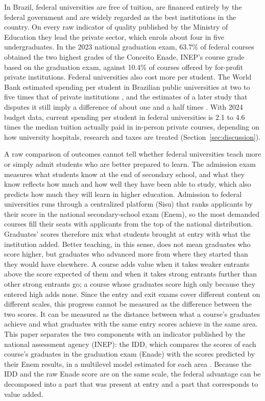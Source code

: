 \documentclass[12pt,letterpaper]{article}
\begin{document}
In Brazil, federal universities are free of tuition, are financed entirely by the federal government and are widely regarded as the best institutions in the country. On every raw indicator of quality published by the Ministry of Education they lead the private sector, which enrols about four in five undergraduates. In the 2023 national graduation exam, 63.7\% of federal courses obtained the two highest grades of the Conceito Enade, INEP's course grade based on the graduation exam, against 10.4\% of courses offered by for-profit private institutions. Federal universities also cost more per student. The World Bank estimated spending per student in Brazilian public universities at two to five times that of private institutions \citep{worldbank2017}, and the estimates of a later study that disputes it still imply a difference of about one and a half times \citep[Table~11]{bielschowsky2022}. With 2024 budget data, current spending per student in federal universities is 2.1 to 4.6 times the median tuition actually paid in in-person private courses, depending on how university hospitals, research and taxes are treated (Section~\ref{sec:discussion}).

A raw comparison of outcomes cannot tell whether federal universities teach more or simply admit students who are better prepared to learn. The admission exam measures what students know at the end of secondary school, and what they know reflects how much and how well they have been able to study, which also predicts how much they will learn in higher education. Admission to federal universities runs through a centralized platform (Sisu) that ranks applicants by their score in the national secondary-school exam (Enem), so the most demanded courses fill their seats with applicants from the top of the national distribution. Graduates' scores therefore mix what students brought at entry with what the institution added. Better teaching, in this sense, does not mean graduates who score higher, but graduates who advanced more from where they started than they would have elsewhere. A course adds value when it takes weaker entrants above the score expected of them and when it takes strong entrants further than other strong entrants go; a course whose graduates score high only because they entered high adds none. Since the entry and exit exams cover different content on different scales, this progress cannot be measured as the difference between the two scores. It can be measured as the distance between what a course's graduates achieve and what graduates with the same entry scores achieve in the same area. This paper separates the two components with an indicator published by the national assessment agency (INEP): the IDD, which compares the scores of each course's graduates in the graduation exam (Enade) with the scores predicted by their Enem results, in a multilevel model estimated for each area \citep{inep2023idd}. Because the IDD and the raw Enade score are on the same scale, the federal advantage can be decomposed into a part that was present at entry and a part that corresponds to value added.
\end{document}
